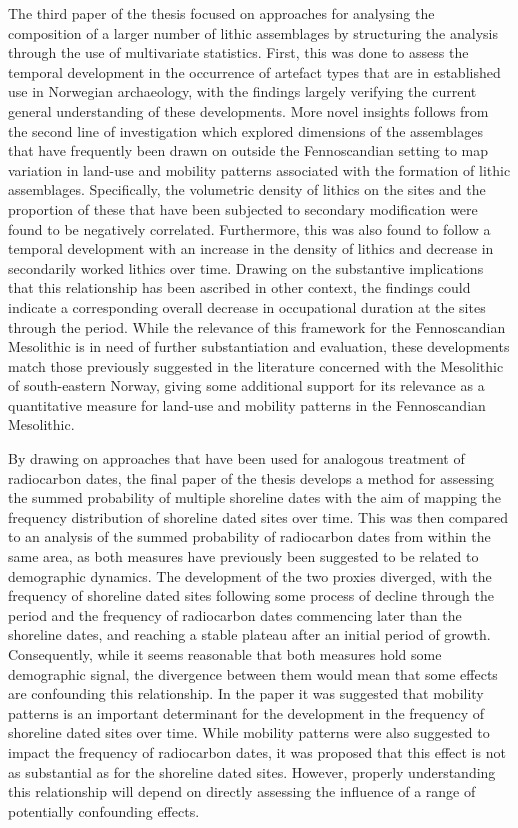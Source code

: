 The third paper of the thesis focused on approaches for analysing the composition of a larger number of lithic assemblages by structuring the analysis through the use of multivariate statistics. First, this was done to assess the temporal development in the occurrence of artefact types that are in established use in Norwegian archaeology, with the findings largely verifying the current general understanding of these developments. More novel insights follows from the second line of investigation which explored dimensions of the assemblages that have frequently been drawn on outside the Fennoscandian setting to map variation in land-use and mobility patterns associated with the formation of lithic assemblages. Specifically, the volumetric density of lithics on the sites and the proportion of these that have been subjected to secondary modification were found to be negatively correlated. Furthermore, this was also found to follow a temporal development with an increase in the density of lithics and decrease in secondarily worked lithics over time. Drawing on the substantive implications that this relationship has been ascribed in other context, the findings could indicate a corresponding overall decrease in occupational duration at the sites through the period. While the relevance of this framework for the Fennoscandian Mesolithic is in need of further substantiation and evaluation, these developments match those previously suggested in the literature concerned with the Mesolithic of south-eastern Norway, giving some additional support for its relevance as a quantitative measure for land-use and mobility patterns in the Fennoscandian Mesolithic.  

By drawing on approaches that have been used for analogous treatment of radiocarbon dates, the final paper of the thesis develops a method for assessing the summed probability of multiple shoreline dates with the aim of mapping the frequency distribution of shoreline dated sites over time. This was then compared to an analysis of the summed probability of radiocarbon dates from within the same area, as both measures have previously been suggested to be related to demographic dynamics. The development of the two proxies diverged, with the frequency of shoreline dated sites following some process of decline through the period and the frequency of radiocarbon dates commencing later than the shoreline dates, and reaching a stable plateau after an initial period of growth. Consequently, while it seems reasonable that both measures hold some demographic signal, the divergence between them would mean that some effects are confounding this relationship. In the paper it was suggested that mobility patterns is an important determinant for the development in the frequency of shoreline dated sites over time. While mobility patterns were also suggested to impact the frequency of radiocarbon dates, it was proposed that this effect is not as substantial as for the shoreline dated sites. However, properly understanding this relationship will depend on directly assessing the influence of a range of potentially confounding effects.


